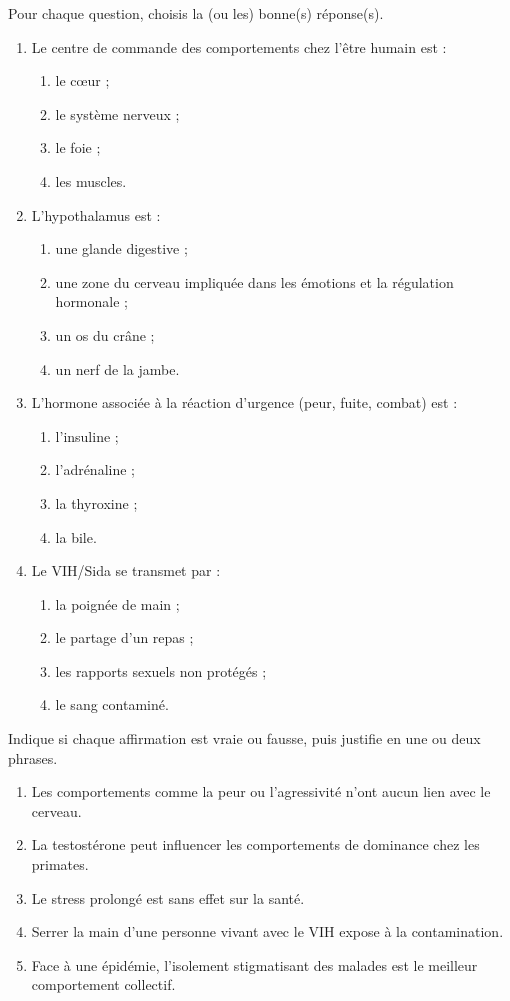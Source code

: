 \documentclass[11pt]{article}
\begin{document}
\begin{exercice}
Pour chaque question, choisis la (ou les) bonne(s) réponse(s).
\begin{enumerate}
\item Le centre de commande des comportements chez l'être humain est :
\begin{enumerate}
\item le cœur ; \item le système nerveux ; \item le foie ; \item les muscles.
\end{enumerate}
\item L'hypothalamus est :
\begin{enumerate}
\item une glande digestive ; \item une zone du cerveau impliquée dans les émotions et la régulation hormonale ; \item un os du crâne ; \item un nerf de la jambe.
\end{enumerate}
\item L'hormone associée à la réaction d'urgence (peur, fuite, combat) est :
\begin{enumerate}
\item l'insuline ; \item l'adrénaline ; \item la thyroxine ; \item la bile.
\end{enumerate}
\item Le VIH/Sida se transmet par :
\begin{enumerate}
\item la poignée de main ; \item le partage d'un repas ; \item les rapports sexuels non protégés ; \item le sang contaminé.
\end{enumerate}
\end{enumerate}
\end{exercice}

\begin{exercice}
Indique si chaque affirmation est vraie ou fausse, puis justifie en une ou deux phrases.
\begin{enumerate}
\item Les comportements comme la peur ou l'agressivité n'ont aucun lien avec le cerveau.
\item La testostérone peut influencer les comportements de dominance chez les primates.
\item Le stress prolongé est sans effet sur la santé.
\item Serrer la main d'une personne vivant avec le VIH expose à la contamination.
\item Face à une épidémie, l'isolement stigmatisant des malades est le meilleur comportement collectif.
\end{enumerate}
\end{exercice}
\end{document}
